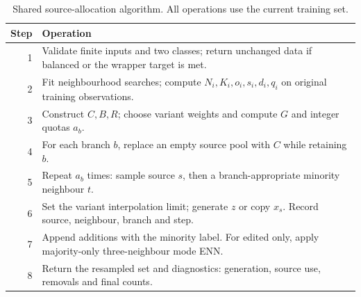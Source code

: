 \documentclass[conference]{IEEEtran}
\begin{document}
\begin{table}[!htbp]\centering\small\caption{Implemented family configurations. No optional majority pre-drop is used.}\label{tab:variants}
\end{table}

\begin{table}[!tp]\centering\small\caption{Shared source-allocation algorithm. All operations use the current training set.}\label{tab:algorithm}
\begin{tabularx}{\linewidth}{rX}\toprule Step & Operation\\\midrule
1 & Validate finite inputs and two classes; return unchanged data if balanced or the wrapper target is met.\\
2 & Fit neighbourhood searches; compute $N_i,K_i,o_i,s_i,d_i,q_i$ on original training observations.\\
3 & Construct $C,B,R$; choose variant weights and compute $G$ and integer quotas $a_b$.\\
4 & For each branch $b$, replace an empty source pool with $C$ while retaining $b$.\\
5 & Repeat $a_b$ times: sample source $s$, then a branch-appropriate minority neighbour $t$.\\
6 & Set the variant interpolation limit; generate $z$ or copy $x_s$. Record source, neighbour, branch and step.\\
7 & Append additions with the minority label. For edited only, apply majority-only three-neighbour mode ENN.\\
8 & Return the resampled set and diagnostics: generation, source use, removals and final counts.\\\bottomrule\end{tabularx}\end{table}
\end{document}
